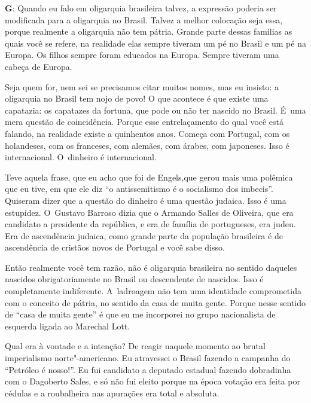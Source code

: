  

\textbf{G}: Quando eu falo em oligarquia brasileira talvez, a expressão
poderia ser modificada para a oligarquia no Brasil. Talvez a melhor
colocação seja essa, porque realmente a oligarquia não tem pátria.
Grande parte dessas famílias as quais você se refere, na realidade elas
sempre tiveram um pé no Brasil e um pé na Europa. Os filhos sempre foram
educados na Europa. Sempre tiveram uma cabeça de Europa.

 

Seja quem for, nem sei se precisamos citar muitos nomes, mas eu insisto:
a oligarquia no Brasil tem nojo de povo! O que acontece é que existe uma
capatazia: os capatazes da fortuna, que pode ou não ter nascido no
Brasil. É~uma mera questão de coincidência. Porque esse entrelaçamento
do qual você está falando, na realidade existe a quinhentos anos. Começa
com Portugal, com os holandeses, com os franceses, com alemães, com
árabes, com japoneses. Isso é internacional. O~dinheiro é internacional.

 

Teve aquela frase, que eu acho que foi de Engels,que gerou mais uma
polêmica que eu tive, em que ele diz ``o antissemitismo é o socialismo
dos imbecis''. Quiseram dizer que a questão do dinheiro é uma questão
judaica. Isso é uma estupidez. O~Gustavo Barroso dizia que o Armando
Salles de Oliveira, que era candidato a presidente da república, e era
de família de portugueses, era judeu. Era de ascendência judaica, como
grande parte da população brasileira é de ascendência de cristãos novos
de Portugal e você sabe disso.

 

Então realmente você tem razão, não é oligarquia brasileira no sentido
daqueles nascidos obrigatoriamente no Brasil ou descendente de nascidos.
Isso é completamente indiferente. A~ladroagem não tem uma identidade
comprometida com o conceito de pátria, no sentido da casa de muita
gente. Porque nesse sentido de ``casa de muita gente'' é que eu me
incorporei no grupo nacionalista de esquerda ligada ao Marechal Lott.

 

Qual era à vontade e a intenção? De reagir naquele momento ao brutal
imperialismo norte"-americano. Eu atravessei o Brasil fazendo a campanha
do ``Petróleo é nosso!''. Eu fui candidato a deputado estadual fazendo
dobradinha com o Dagoberto Sales, e só não fui eleito porque na época
votação era feita por cédulas e a roubalheira nas apurações era total e
absoluta.

